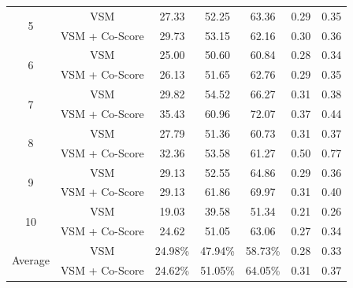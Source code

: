 \documentclass[conference]{IEEEtran}
\begin{document}
\begin{table}[htbp]
{\begin{tabular}{c|c|c|c|c|c|c}
			\multirow{2}{*}{5}                                                                               & VSM & 27.33 & 52.25 & 63.36 & 0.29 & 0.35 \\   \cline{2-7} &VSM + Co-Score                                                                       & 29.73                                                 & 53.15                                                 & 62.16                                                  &  0.30   & 0.36     \\  \hline
			\multirow{2}{*}{6}                                                                               & VSM & 25.00 & 50.60 & 60.84 & 0.28 & 0.34 \\  \cline{2-7}  &VSM + Co-Score 
			&26.13 &
			51.65 &
			62.76 & 0.29 &
			0.35     \\  \hline 
			\multirow{2}{*}{7}                                                                               & VSM & 29.82 & 54.52 & 66.27 & 0.31 & 0.38 \\  \cline{2-7}  &VSM + Co-Score 
			
			&35.43 &
			60.96 &
			72.07 & 0.37 &
			0.44     \\  \hline
			\multirow{2}{*}{8}                                                                               & VSM & 27.79 & 51.36 & 60.73 & 0.31 & 0.37 \\  \cline{2-7}  &VSM + Co-Score 
			&32.36 &
			53.58 &
			61.27 & 0.50 &
			0.77    \\  \hline
			\multirow{2}{*}{9}                                                                               & VSM & 29.13 & 52.55 & 64.86 & 0.29 & 0.36 \\  \cline{2-7}   &VSM + Co-Score 
			&29.13 &
			61.86 &
			69.97 & 0.31 &
			0.40    \\  \hline
			\multirow{2}{*}{10}                                                                               & VSM & 19.03 & 39.58 & 51.34 & 0.21 & 0.26 \\  \cline{2-7}  &VSM + Co-Score
			&24.62 &
			51.05 &
			63.06 & 0.27 &
			0.34    \\ \hline \hline
			\multirow{2}{*}{Average}                                                                               & VSM & 24.98\% & 47.94\% & 58.73\% & 0.28 & 0.33 \\  \cline{2-7}   &VSM + Co-Score      & 24.62\%                                                 & 51.05\%                                                 & 64.05\%                                                  &   0.31  &  0.37    \\ 
			\hline
	\end{tabular}}
\centering
\end{table}
\end{document}
